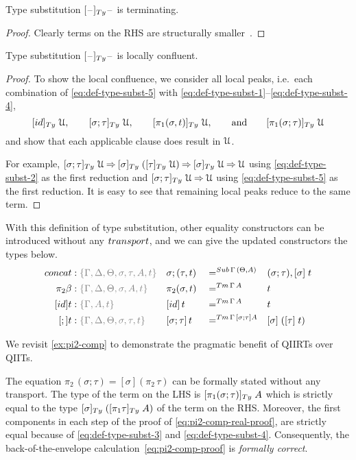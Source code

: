 \documentclass[a4paper,UKenglish,numberwithinsect,cleveref,thm-restate]{lipics-v2021}
\newcommand{\danger}{\marginpar[\hfill\dbend]{\dbend\hfill}}
\begin{document}
\begin{proposition}[Termination]
  Type substitution $[\blank]_{\Ty}\blank$ is terminating.
  \danger
\end{proposition}
\begin{proof}
  Clearly terms on the RHS are structurally smaller~\cite{Abel2002}.
\end{proof}
\begin{proposition} \label{prop:local-confluence-1}
  Type substitution $[\blank]_{\Ty}\blank$ is locally confluent.
  \danger
\end{proposition}
\begin{proof}
  To show the local confluence, we consider all local peaks, i.e.\ each combination of \eqref{eq:def-type-subst-5} with \eqref{eq:def-type-subst-1}--\eqref{eq:def-type-subst-4},
  \[
    [\idS]_{\Ty}\;\UU, \qquad [\sigma;\tau]_{\Ty}\;\UU, \qquad [\pi_1(\sigma, t)]_{\Ty}\;\UU, \qquad\text{and}\qquad [\pi_1(\sigma; \tau)]_{\Ty}\;\UU
  \]
  and show that each applicable clause does result in $\mathcal{U}$.

  For example, $[\sigma;\tau]_{\Ty}\;\UU \reduce [\sigma]_{\Ty}\;([\tau]_{\Ty}\;\UU) \reduce [\sigma]_{\Ty}\;\UU \reduce \UU$ using \eqref{eq:def-type-subst-2} as the first reduction and $[\sigma;\tau]_{\Ty}\;\UU \reduce \UU$ using \eqref{eq:def-type-subst-5} as the first reduction.
  It is easy to see that remaining local peaks reduce to the same term.
\end{proof}

With this definition of type substitution, other equality constructors can be introduced without any $\transp$, and we can give the updated constructors the types below.
\begin{alignat*}{5}
  \mathsf{concat} & : \implicit{\Gamma, \Delta, \Theta, \sigma, \tau, A, t} &&\sigma ; (\tau , t) && =^{\Sub\,\Gamma\,(\Theta, A)} &&  (\sigma ; \tau), [ \sigma ]\;t \\
  \pi_2\beta      & : \implicit{\Gamma, \Delta, \Theta, \sigma, A, t} && \pi_2(\sigma , t)        && =^{\Tm\,\Gamma\, A} &&  t \\
  [\idS]t         & : \implicit{\Gamma, A, t} && {[\idS]\,t}          && =^{\Tm\,\Gamma\,A} && t \\
  [;]t            & : \implicit{\Gamma, \Delta, \Theta, \sigma, \tau, t} && {[\sigma ; \tau]\,t} && =^{\Tm\,\Gamma\,[\sigma ; \tau] A} && {[ \sigma ]\;([ \tau ]\;t})
\end{alignat*}

We revisit \cref{ex:pi2-comp} to demonstrate the pragmatic benefit of QIIRTs over QIITs.
\begin{example}
  The equation $\pi_2\,(\sigma; \tau) = [\sigma](\pi_2\,\tau)$ can be formally stated without any transport.
  The type of the term on the LHS is $[\pi_1(\sigma;\tau)]_{\Ty}\;A$ which is strictly equal to the type $[\sigma]_\Ty\;([\pi_1\tau]_\Ty\;A)$ of the term on the RHS.
  Moreover, the first components in each step of the proof of \eqref{eq:pi2-comp-real-proof}, are strictly equal because of \eqref{eq:def-type-subst-3} and \eqref{eq:def-type-subst-4}.
  Consequently, the back-of-the-envelope calculation~\eqref{eq:pi2-comp-proof} is \emph{formally correct}.
\end{example}
\end{document}
